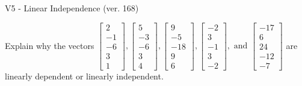 \begin{exercise}
  \begin{exerciseTitle}V5 - Linear Independence (ver. 168)\end{exerciseTitle}
  \begin{exerciseStatement}
    Explain why the vectors \(\left[\begin{array}{r}
2 \\
-1 \\
-6 \\
3 \\
1
\end{array}\right] , \left[\begin{array}{r}
5 \\
-3 \\
-6 \\
3 \\
4
\end{array}\right] , \left[\begin{array}{r}
9 \\
-5 \\
-18 \\
9 \\
6
\end{array}\right] , \left[\begin{array}{r}
-2 \\
3 \\
-1 \\
3 \\
-2
\end{array}\right] , \text{ and } \left[\begin{array}{r}
-17 \\
6 \\
24 \\
-12 \\
-7
\end{array}\right]\) are linearly dependent or linearly independent.	



\end{exerciseStatement}
\end{exercise}
